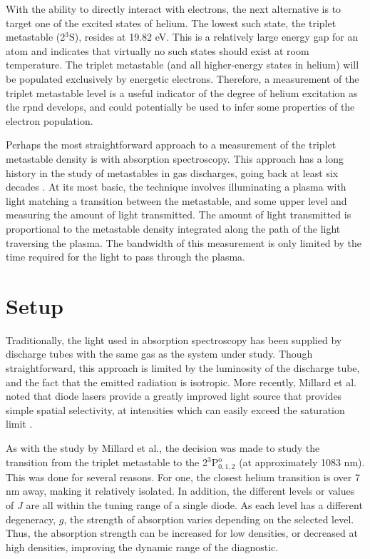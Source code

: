 With the ability to directly interact with electrons, the next alternative is to
target one of the excited states of helium. The lowest such state, the triplet
metastable (2$^3$S), resides at 19.82 eV. This is a relatively large energy gap
for an atom and indicates that virtually no such states should exist at room
temperature. The triplet metastable (and all higher-energy states in helium)
will be populated exclusively by energetic electrons. Therefore, a measurement
of the triplet metastable level is a useful indicator of the degree of helium
excitation as the \acs{rpnd} develops, and could potentially be used to infer
some properties of the electron population.

Perhaps the most straightforward approach to a measurement of the triplet
metastable density is with absorption spectroscopy. This approach has a long
history in the study of metastables in gas discharges, going back at least six
decades \cite{Phelps1953}. At its most basic, the technique involves
illuminating a plasma with light matching a transition between the metastable,
and some upper level and measuring the amount of light transmitted. The amount
of light transmitted is proportional to the metastable density integrated along
the path of the light traversing the plasma. The bandwidth of this measurement
is only limited by the time required for the light to pass through the plasma.

\section{Setup}

Traditionally, the light used in absorption spectroscopy has been supplied by
discharge tubes with the same gas as the system under study. Though
straightforward, this approach is limited by the luminosity of the discharge
tube, and the fact that the emitted radiation is isotropic. More recently,
Millard et al. noted that diode lasers provide a greatly improved light source
that provides simple spatial selectivity, at intensities which can easily exceed
the saturation limit \cite{Millard1998}.

As with the study by Millard et al., the decision was made to study the
transition from the triplet metastable to the 2$^3$P$^\mathrm{o}_{0,1,2}$ (at
approximately 1083 nm). This was done for several reasons. For one, the closest
helium transition is over 7 nm away, making it relatively isolated. In addition,
the different levels or values of $J$ are all within the tuning range of a
single diode. As each level has a different degeneracy, $g$, the strength of
absorption varies depending on the selected level. Thus, the absorption strength
can be increased for low densities, or decreased at high densities, improving
the dynamic range of the diagnostic.

